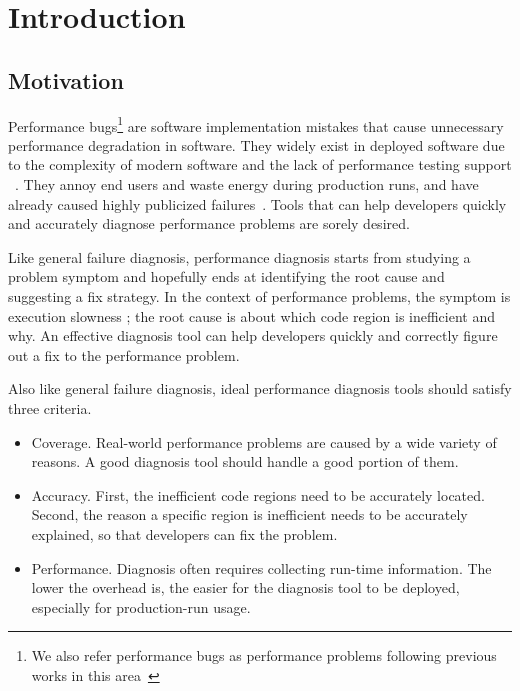 \section{Introduction}
\label{sec:intro}
\subsection{Motivation}

Performance bugs\footnote{We also refer performance bugs as performance problems
following previous works in this area~\cite{PerfBug,Alabama,SongOOPSLA2014}} 
are software implementation mistakes that cause unnecessary performance
degradation in software. They widely exist in deployed software due to the 
complexity of modern software and the lack of performance testing support
~\cite{s2e,PerfBug,perf.fse10,rily.perftest,perfantipattern,xiao13:context}. 
They annoy end users and waste energy during production runs, and 
have already caused highly publicized failures~\cite{ACA-health,colorado}.
Tools that can help
developers quickly and accurately diagnose performance problems
are sorely desired.

Like general failure diagnosis, 
performance diagnosis starts from studying a problem symptom and hopefully ends
at identifying the root cause and suggesting a fix strategy. 
In the context of performance problems,
the symptom is 
execution 
slowness \cite{SongOOPSLA2014}; the root cause is about
which code region is inefficient and why.
An effective diagnosis tool can help developers quickly
and correctly figure out a fix to the performance problem.

Also like general failure diagnosis, ideal performance diagnosis tools should
satisfy three criteria.
\begin{itemize}
\item Coverage. 
Real-world performance problems are caused by a wide variety of reasons.
A good diagnosis tool should handle a good portion of them.

\item Accuracy. 
First, the inefficient code regions need to be accurately located.
Second, the reason a specific region is inefficient needs to be accurately
explained, so that developers can fix the problem.

\item Performance. 
Diagnosis often requires collecting run-time information. The lower the overhead
is, the easier for the diagnosis tool to be deployed, especially for 
production-run usage. 
\end{itemize}

